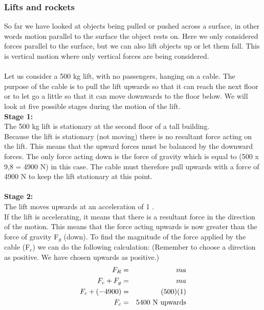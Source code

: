 \subsubsection{Lifts and rockets}
So far we have looked at objects being pulled or pushed across a surface, in other words motion parallel to the surface the object rests on. Here we only considered forces parallel to the surface, but we can also lift objects up or let them fall. This is vertical motion where only vertical forces are being considered.\\
\\
Let us consider a 500 kg lift, with no passengers, hanging on a cable. The purpose of the cable is to pull the lift upwards so that it can reach the next floor or to let go a little so that it can move downwards to the floor below. We will look at five possible stages during the motion of the lift.\\

{\bf{Stage 1:}}\\ The 500 kg lift is stationary at the second floor of a tall building.\\
Because the lift is stationary (not moving) there is no resultant force acting on the lift. This means that the upward forces must be balanced by the downward forces. The only force acting down is the force of gravity which is equal to (500 x 9,8 = 4900 N) in this case. The cable must therefore pull upwards with a force of 4900 N to keep the lift stationary at this point.\\
\\
{\bf{Stage 2:}}\\ The lift moves upwards at an acceleration of 1 \mss.\\
If the lift is accelerating, it means that there is a resultant force in the direction of the motion. This means that the force acting upwards is now greater than the force of gravity F$_{g}$ (down). To find the magnitude of the force applied by the cable (F$_{c}$) we can do the following calculation: (Remember to choose a direction as positive. We have chosen upwards as positive.)\\

\begin{eqnarray*}
F_{R} &=& ma\\
F_{c}+ F_{g} &=& ma\\
F_{c}+ (-4900) &=& (500)(1)\\
F_{c} &=& 5400~\rm{N~upwards}
\end{eqnarray*}

